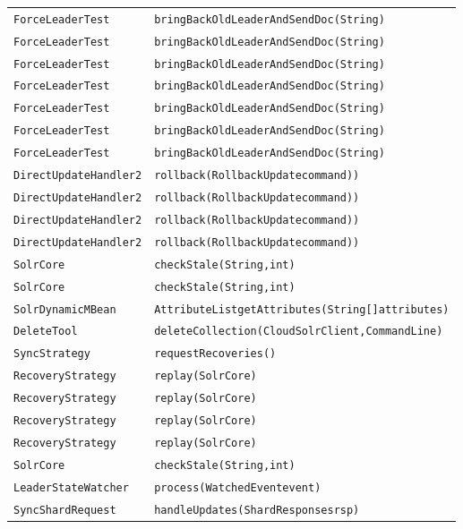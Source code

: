 \begin{center}
\begin{longtable}{ll}
\lstinline/ForceLeaderTest/&{\lstinline/bringBackOldLeaderAndSendDoc(String)/}\\
\lstinline/ForceLeaderTest/&{\lstinline/bringBackOldLeaderAndSendDoc(String)/}\\
\lstinline/ForceLeaderTest/&{\lstinline/bringBackOldLeaderAndSendDoc(String)/}\\
\lstinline/ForceLeaderTest/&{\lstinline/bringBackOldLeaderAndSendDoc(String)/}\\
\lstinline/ForceLeaderTest/&{\lstinline/bringBackOldLeaderAndSendDoc(String)/}\\
\lstinline/ForceLeaderTest/&{\lstinline/bringBackOldLeaderAndSendDoc(String)/}\\
\lstinline/ForceLeaderTest/&{\lstinline/bringBackOldLeaderAndSendDoc(String)/}\\
\lstinline/DirectUpdateHandler2/&{\lstinline/rollback(RollbackUpdatecommand))/}\\
\lstinline/DirectUpdateHandler2/&{\lstinline/rollback(RollbackUpdatecommand))/}\\
\lstinline/DirectUpdateHandler2/&{\lstinline/rollback(RollbackUpdatecommand))/}\\
\lstinline/DirectUpdateHandler2/&{\lstinline/rollback(RollbackUpdatecommand))/}\\
\lstinline/SolrCore/&{\lstinline/checkStale(String,int)/}\\
\lstinline/SolrCore/&{\lstinline/checkStale(String,int)/}\\
\lstinline/SolrDynamicMBean/&{\lstinline/AttributeListgetAttributes(String[]attributes)/}\\
\lstinline/DeleteTool/&{\lstinline/deleteCollection(CloudSolrClient,CommandLine)/}\\
\lstinline/SyncStrategy/&{\lstinline/requestRecoveries()/}\\
\lstinline/RecoveryStrategy/&{\lstinline/replay(SolrCore)/}\\
\lstinline/RecoveryStrategy/&{\lstinline/replay(SolrCore)/}\\
\lstinline/RecoveryStrategy/&{\lstinline/replay(SolrCore)/}\\
\lstinline/RecoveryStrategy/&{\lstinline/replay(SolrCore)/}\\
\lstinline/SolrCore/&{\lstinline/checkStale(String,int)/}\\
\lstinline/LeaderStateWatcher/&{\lstinline/process(WatchedEventevent)/}\\
\lstinline/SyncShardRequest/&{\lstinline/handleUpdates(ShardResponsesrsp)/}\\

\end{longtable}
\end{center}
